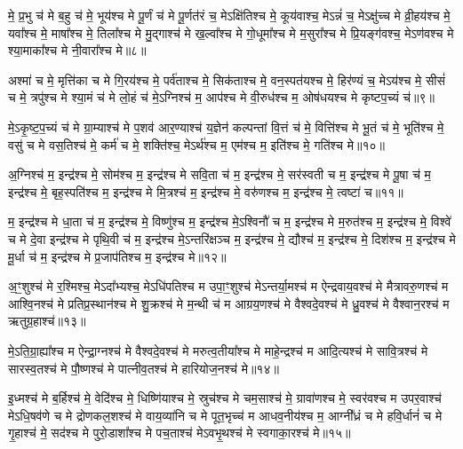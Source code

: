 मे॒ प्र॒भु च॑ मे ब॒हु च॑ मे॒ भूय॑श्च मे पू॒र्णं च॑ मे पू॒र्णत॑रं च॒ मे\-ऽक्षि॑तिश्च मे॒ कूय॑वाश्च॒ मे\-ऽन्नं॑ च॒ मे\-ऽक्षु॑च्च मे व्री॒हय॑श्च मे॒ यवा᳚श्च मे॒ माषा᳚श्च मे॒ तिला᳚श्च मे मु॒द्गाश्च॑ मे ख॒ल्वा᳚श्च मे गो॒धूमा᳚श्च मे म॒सुरा᳚श्च मे प्रि॒यङ्ग॑वश्च॒ मे\-ऽण॑वश्च मे श्या॒माका᳚श्च मे नी॒वारा᳚श्च मे॥८॥

{\anuvakamend[{वि॒भु च॑ म॒सुरा॒श्चतु॑र्दश च॥४॥}]}

अश्मा॑ च मे॒ मृत्ति॑का च मे गि॒रय॑श्च मे॒ पर्व॑ताश्च मे॒ सिक॑ताश्च मे॒ वन॒स्पत॑यश्च मे॒ हिर॑ण्यं च॒ मे\-ऽय॑श्च मे॒ सीसं॑ च मे॒ त्रपु॑श्च मे श्या॒मं च॑ मे लो॒हं च॑ मे॒\-ऽग्निश्च॑ म॒ आप॑श्च मे वी॒रुध॑श्च म॒ ओष॑धयश्च मे कृष्टप॒च्यं च॑॥९॥

मे॒\-ऽकृ॒ष्ट॒प॒च्यं च॑ मे ग्रा॒म्याश्च॑ मे प॒शव॑ आर॒ण्याश्च॑ य॒ज्ञेन॑ कल्पन्तां वि॒त्तं च॑ मे॒ वित्ति॑श्च मे भू॒तं च॑ मे॒ भूति॑श्च मे॒ वसु॑ च मे वस॒तिश्च॑ मे॒ कर्म॑ च मे॒ शक्ति॑श्च॒ मे\-ऽर्थ॑श्च म॒ एम॑श्च म॒ इति॑श्च मे॒ गति॑श्च मे॥१०॥

{\anuvakamend[{कृ॒ष्ट॒प॒च्यञ्चा॒ष्टाच॑त्वारिꣳशच्च॥५॥}]}

अ॒ग्निश्च॑ म॒ इन्द्र॑श्च मे॒ सोम॑श्च म॒ इन्द्र॑श्च मे सवि॒ता च॑ म॒ इन्द्र॑श्च मे॒ सर॑स्वती च म॒ इन्द्र॑श्च मे पू॒षा च॑ म॒ इन्द्र॑श्च मे॒ बृह॒स्पति॑श्च म॒ इन्द्र॑श्च मे मि॒त्रश्च॑ म॒ इन्द्र॑श्च मे॒ वरु॑णश्च म॒ इन्द्र॑श्च मे॒ त्वष्टा॑ च॥११॥

म॒ इन्द्र॑श्च मे धा॒ता च॑ म॒ इन्द्र॑श्च मे॒ विष्णु॑श्च म॒ इन्द्र॑श्च मे॒\-ऽश्विनौ॑ च म॒ इन्द्र॑श्च मे म॒रुत॑श्च म॒ इन्द्र॑श्च मे॒ विश्वे॑ च मे दे॒वा इन्द्र॑श्च मे पृथि॒वी च॑ म॒ इन्द्र॑श्च मे॒\-ऽन्तरि॑क्षञ्च म॒ इन्द्र॑श्च मे॒ द्यौश्च॑ म॒ इन्द्र॑श्च मे॒ दिश॑श्च म॒ इन्द्र॑श्च मे मू॒र्धा च॑ म॒ इन्द्र॑श्च मे प्र॒जाप॑तिश्च म॒ इन्द्र॑श्च मे॥१२॥

{\anuvakamend[{त्वष्टा॑ च॒ द्यौश्च॑ म॒ एक॑विꣳशतिश्च॥६॥}]}

अ॒ꣳ॒शुश्च॑ मे र॒श्मिश्च॒ मे\-ऽदा᳚भ्यश्च॒ मे\-ऽधि॑पतिश्च म उपा॒ꣳ॒शुश्च॑ मे\-ऽन्तर्या॒मश्च॑ म ऐन्द्रवाय॒वश्च॑ मे मैत्रावरु॒णश्च॑ म आश्वि॒नश्च॑ मे प्रतिप्र॒स्थान॑श्च मे शु॒क्रश्च॑ मे म॒न्थी च॑ म आग्रय॒णश्च॑ मे वैश्वदे॒वश्च॑ मे ध्रु॒वश्च॑ मे वैश्वान॒रश्च॑ म ऋतुग्र॒हाश्च॑॥१३॥

मे॒\-ऽति॒ग्रा॒ह्या᳚श्च म ऐन्द्रा॒ग्नश्च॑ मे वैश्वदे॒वश्च॑ मे मरुत्व॒तीया᳚श्च मे माहे॒न्द्रश्च॑ म आदि॒त्यश्च॑ मे सावि॒त्रश्च॑ मे सारस्व॒तश्च॑ मे पौ॒ष्णश्च॑ मे पात्नीव॒तश्च॑ मे हारियोज॒नश्च॑ मे॥१४॥

{\anuvakamend[{ऋ॒तु॒ग्र॒हाश्च॒ चतु॑स्त्रिꣳशच्च॥७॥}]}

इ॒ध्मश्च॑ मे ब॒र्\mbox{}हिश्च॑ मे॒ वेदि॑श्च मे॒ धिष्णि॑याश्च मे॒ स्रुच॑श्च मे चम॒साश्च॑ मे॒ ग्रावा॑णश्च मे॒ स्वर॑वश्च म उपर॒वाश्च॑ मे\-ऽधि॒षव॑णे च मे द्रोणकल॒शश्च॑ मे वाय॒व्या॑नि च मे पूत॒भृच्च॑ म आधव॒नीय॑श्च म॒ आग्नी᳚ध्रं च मे हवि॒र्धानं॑ च मे गृ॒हाश्च॑ मे॒ सद॑श्च मे पुरो॒डाशा᳚श्च मे पच॒ताश्च॑ मे\-ऽवभृ॒थश्च॑ मे स्वगाका॒रश्च॑ मे॥१५॥

